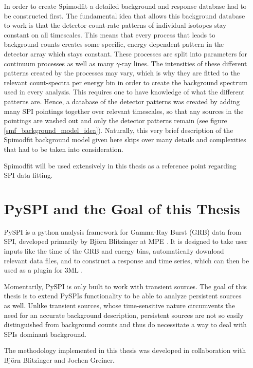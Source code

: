 \documentclass{report}
\begin{document}
In order to create Spimodfit a detailed background and response database had to be constructed first. The fundamental idea that allows this background database to work is that the detector count-rate patterns of individual isotopes stay constant on all timescales. This means that every process that leads to background counts creates some specific, energy dependent pattern in the detector array which stays constant. These processes are split into parameters for continuum processes as well as many $\gamma$-ray lines. The intensities of these different patterns created by the processes may vary, which is why they are fitted to the relevant count-spectra per energy bin in order to create the background spectrum used in every analysis. This requires one to have knowledge of what the different patterns are. Hence, a database of the detector patterns was created by adding many SPI pointings together over relevant timescales, so that any sources in the pointings are washed out and only the detector patterns remain (see figure \ref{smf_background_model_idea}). Naturally, this very brief description of the Spimodfit background model given here skips over many details and complexities that had to be taken into consideration.

Spimodfit will be used extensively in this thesis as a reference point regarding SPI data fitting.



\section{PySPI and the Goal of this Thesis}
PySPI is a python analysis framework for Gamma-Ray Burst (GRB) data from SPI, developed primarily by Björn Blitzinger at MPE \cite{Biltzinger2022}. It is designed to take user inputs like the time of the GRB and energy bins, automatically download relevant data files, and to construct a response and time series, which can then be used as a plugin for 3ML \cite{3ml}.

Momentarily, PySPI is only built to work with transient sources. The goal of this thesis is to extend PySPIs functionality to be able to analyze persistent sources as well. Unlike transient sources, whose time-sensitive nature circumvents the need for an accurate background description, persistent sources are not so easily distinguished from background counts and thus do necessitate a way to deal with SPIs dominant background.

The methodology implemented in this thesis was developed in collaboration with Björn Blitzinger and Jochen Greiner.
\end{document}
